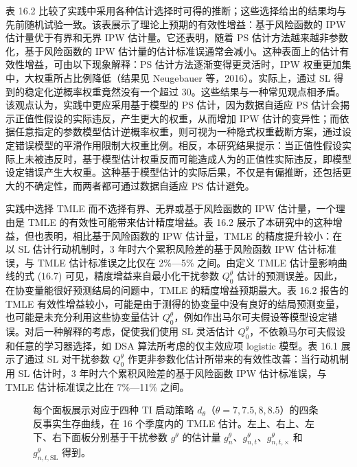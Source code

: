 表 16.2 比较了实践中采用各种估计选择时可得的推断；这些选择给出的结果均与先前随机试验一致。该表展示了理论上预期的有效性增益：基于风险函数的 IPW 估计量优于有界和无界 IPW 估计量。它还表明，随着 PS 估计方法越来越非参数化，基于风险函数的 IPW 估计量的估计标准误通常会减小。这种表面上的估计有效性增益，可由以下现象解释：PS 估计方法逐渐变得更灵活时，IPW 权重更加集中，大权重所占比例降低（结果见 Neugebauer 等，2016）。实际上，通过 SL 得到的稳定化逆概率权重竟然没有一个超过 30。这些结果与一种常见观点相矛盾。该观点认为，实践中更应采用基于模型的 PS 估计，因为数据自适应 PS 估计会揭示正值性假设的实际违反，产生更大的权重，从而增加 IPW 估计的变异性；而依据任意指定的参数模型估计逆概率权重，则可视为一种隐式权重截断方案，通过设定错误模型的平滑作用限制大权重比例。相反，本研究结果提示：当正值性假设实际上未被违反时，基于模型估计权重反而可能造成人为的正值性实际违反，即模型设定错误产生大权重。这种基于模型估计的实际后果，不仅是有偏推断，还包括更大的不确定性，而两者都可通过数据自适应 PS 估计避免。

实践中选择 TMLE 而不选择有界、无界或基于风险函数的 IPW 估计量，一个理由是 TMLE 的有效性可能带来估计精度增益。表 16.2 展示了本研究中的这种增益，但也表明，相比基于风险函数的 IPW 估计量，TMLE 的精度提升较小：在以 SL 估计行动机制时，3 年时六个累积风险差的基于风险函数 IPW 估计标准误，与 TMLE 估计标准误之比仅在 2\%—5\% 之间。由定义 TMLE 估计量影响曲线的式 (16.7) 可见，精度增益来自最小化干扰参数 $Q_0^\theta$ 估计的预测误差。因此，在协变量能很好预测结局的问题中，TMLE 的精度增益预期最大。表 16.2 报告的 TMLE 有效性增益较小，可能是由于测得的协变量中没有良好的结局预测变量，也可能是未充分利用这些协变量估计 $Q_0^\theta$，例如作出马尔可夫假设等模型设定错误。对后一种解释的考虑，促使我们使用 SL 灵活估计 $Q_0^\theta$，不依赖马尔可夫假设和任意的学习器选择，如 DSA 算法所考虑的仅主效应项 logistic 模型。表 16.1 展示了通过 SL 对干扰参数 $Q_0^\theta$ 作更非参数化估计所带来的有效性改善：当行动机制用 SL 估计时，3 年时六个累积风险差的基于风险函数 IPW 估计标准误，与 TMLE 估计标准误之比在 7\%—11\% 之间。



\begin{figure}[p]
\centering
\resizebox{.98\textwidth}{!}{}
\caption{每个面板展示对应于四种 TI 启动策略 $d_\theta$（$\theta=7,7.5,8,8.5$）的四条反事实生存曲线，在 16 个季度内的 TMLE 估计。左上、右上、左下、右下面板分别基于干扰参数 $g^\theta$ 的估计量 $g_n^\theta$、$g^\theta_{n,t}$、$g^\theta_{n,t,\times}$ 和 $g^\theta_{n,t,\mathrm{SL}}$ 得到。}
\label{fig:ch16-survival}
\end{figure}

